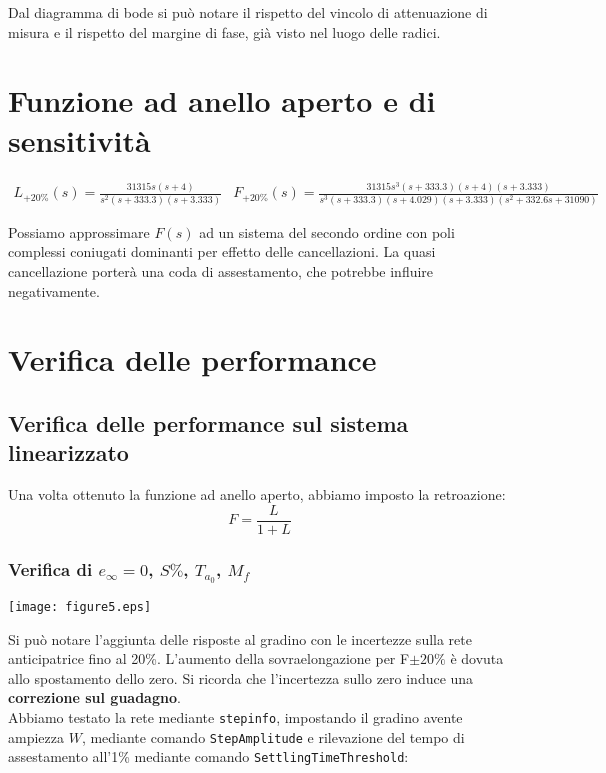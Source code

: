 \documentclass{article}
\begin{document}
Dal diagramma di bode si può notare il rispetto del vincolo di attenuazione di misura e il rispetto del margine di fase, già visto nel luogo delle radici.

\section{Funzione ad anello aperto e di sensitività}

$$
\begin{array}{cc}
    L_{+20\%}(s)=\frac{31315 s (s+4)}{s^2 (s+333.3) (s+3.333)} & F_{+20\%}(s)=\frac{31315 s^3 (s+333.3) (s+4) (s+3.333)}{s^3 (s+333.3) (s+4.029) (s+3.333) (s^2 + 332.6s + 31090)}
\end{array}
$$

Possiamo approssimare $F(s)$ ad un sistema del secondo ordine con poli complessi coniugati dominanti per effetto delle cancellazioni. La quasi cancellazione porterà una coda di assestamento, che potrebbe influire negativamente.


\newpage

\section{Verifica delle performance}

\subsection{Verifica delle performance sul sistema linearizzato}

Una volta ottenuto la funzione ad anello aperto, abbiamo imposto la retroazione:
$$
F = \frac{L}{1+L}
$$

\subsubsection{Verifica di $e_\infty=0$, $S\%$, $T_{a_0}$, $M_f$}

\begin{center}
    \texttt{[image: figure5.eps]}
\end{center}

Si può notare l'aggiunta delle risposte al gradino con le incertezze sulla rete anticipatrice fino al 20\%. L'aumento della sovraelongazione per F$\pm20\%$ è dovuta allo spostamento dello zero. Si ricorda che l'incertezza sullo zero induce una \textbf{correzione sul guadagno}.\\

Abbiamo testato la rete mediante \texttt{stepinfo}, impostando il gradino avente ampiezza $W$, mediante comando \texttt{StepAmplitude} e rilevazione del tempo di assestamento all'1\% mediante comando \texttt{SettlingTimeThreshold}:
\end{document}
